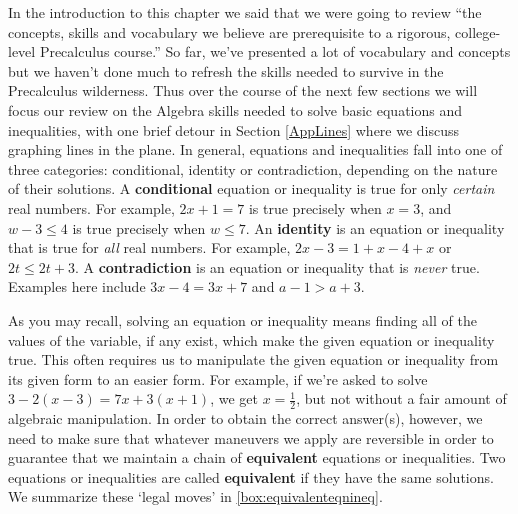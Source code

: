 

\setcounter{footnote}{0}

\label{AppLinearEqIneq}

In the introduction to this chapter we said that we were going to review ``the concepts, skills and vocabulary we believe are prerequisite to a rigorous, college-level Precalculus course.''  So far, we've presented a lot of vocabulary and concepts but we haven't done much to refresh the skills needed to survive in the Precalculus wilderness.  Thus over the course of the next few sections we will focus our review on the Algebra skills needed to solve basic equations and inequalities, with one brief detour in Section \ref{AppLines} where we discuss graphing lines in the plane.  In general, equations and inequalities fall into one of three categories:  conditional, identity or contradiction, depending on the nature of their solutions.  A \textbf{conditional} equation or inequality is true for only \textit{certain} real numbers.  For example, $2x+1 = 7$ is true precisely when $x = 3$, and $w - 3 \leq 4$ is true precisely when $w \leq 7$.  An \textbf{identity} is an equation or inequality that is true for \textit{all} real numbers.  For example, $2x -3 = 1+x-4+x$ or $2t \leq 2t + 3$.  A \textbf{contradiction} is an equation or inequality that is \textit{never} true.  Examples here include $3x - 4 = 3x + 7$ and $a - 1 > a + 3$.  

\bigskip

As you may recall, solving an equation or inequality means finding all of the values of the variable, if any exist, which make the given equation or inequality true.  This often requires us to manipulate the given equation or inequality from its given form to an easier form.  For example, if we're asked to solve $3 - 2(x-3) = 7x + 3(x+1)$, we get $x = \frac{1}{2}$, but not without a fair amount of algebraic manipulation. In order to obtain the correct answer(s), however, we need to make sure that whatever maneuvers we apply are reversible in order to guarantee that we maintain a chain of \textbf{equivalent} equations or inequalities.  Two equations or inequalities are called \textbf{equivalent} if they have the same solutions.  We summarize these `legal moves' in \autoref{box:equivalenteqnineq}.

